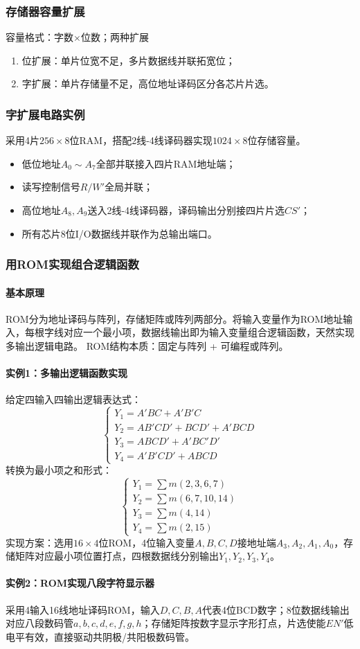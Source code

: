 \subsubsection{存储器容量扩展}
容量格式：字数$\times$位数；两种扩展
\begin{enumerate}
    \item 位扩展：单片位宽不足，多片数据线并联拓宽位；
    \item 字扩展：单片存储量不足，高位地址译码区分各芯片片选。
\end{enumerate}

\subsubsection{字扩展电路实例}
采用4片$256\times8$位RAM，搭配2线-4线译码器实现$1024\times8$位存储容量。
\begin{itemize}
    \item 低位地址$A_0\sim A_7$全部并联接入四片RAM地址端；
    \item 读写控制信号$R/W'$全局并联；
    \item 高位地址$A_8,A_9$送入2线-4线译码器，译码输出分别接四片片选$CS'$；
    \item 所有芯片8位I/O数据线并联作为总输出端口。
\end{itemize}

\subsubsection{用ROM实现组合逻辑函数}
\paragraph{基本原理}
ROM分为地址译码与阵列，存储矩阵或阵列两部分。将输入变量作为ROM地址输入，每根字线对应一个最小项，数据线输出即为输入变量组合逻辑函数，天然实现多输出逻辑电路。
ROM结构本质：固定与阵列 + 可编程或阵列。

\paragraph{实例1：多输出逻辑函数实现}
给定四输入四输出逻辑表达式：
\[
\begin{cases}
Y_1 = A'BC + A'B'C \\
Y_2 = AB'CD' + BCD' + A'BCD \\
Y_3 = ABCD' + A'BC'D' \\
Y_4 = A'B'CD' + ABCD
\end{cases}
\]
转换为最小项之和形式：
\[
\begin{cases}
Y_1 = \sum m(2,3,6,7) \\
Y_2 = \sum m(6,7,10,14) \\
Y_3 = \sum m(4,14) \\
Y_4 = \sum m(2,15)
\end{cases}
\]
实现方案：选用$16\times4$位ROM，4位输入变量$A,B,C,D$接地址端$A_3,A_2,A_1,A_0$，存储矩阵对应最小项位置打点，四根数据线分别输出$Y_1,Y_2,Y_3,Y_4$。

\paragraph{实例2：ROM实现八段字符显示器}
采用4输入16线地址译码ROM，输入$D,C,B,A$代表4位BCD数字；8位数据线输出对应八段数码管$a,b,c,d,e,f,g,h$；存储矩阵按数字显示字形打点，片选使能$EN'$低电平有效，直接驱动共阴极/共阳极数码管。